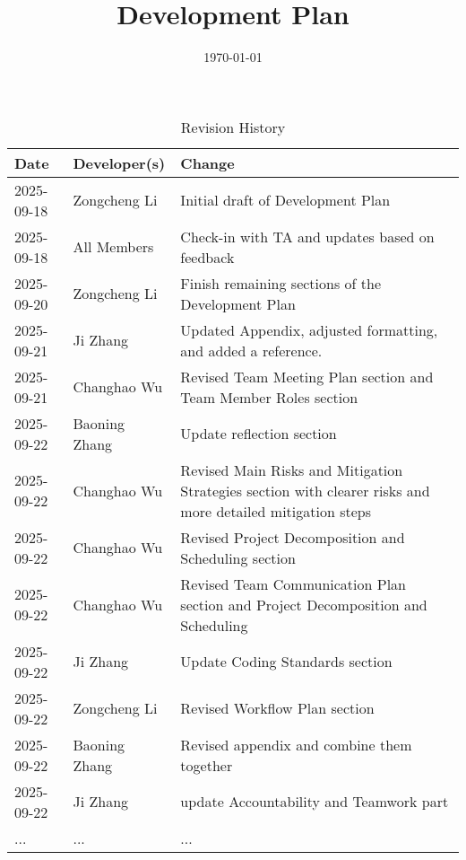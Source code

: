 \documentclass{article}
\title{Development Plan\\\progname}
\author{\authname}
\date{\today}
\begin{document}
\maketitle

\begin{table}[hp]
\caption{Revision History} \label{TblRevisionHistory}
\begin{tabularx}{\textwidth}{llX}
\toprule
\textbf{Date} & \textbf{Developer(s)} & \textbf{Change}\\
\midrule
2025-09-18 & Zongcheng Li   & Initial draft of Development Plan \\
2025-09-18 & All Members    & Check-in with TA and updates based on feedback \\
2025-09-20 & Zongcheng Li   & Finish remaining sections of the Development Plan \\
2025-09-21 & Ji Zhang       & Updated Appendix, adjusted formatting, and added a reference.\\
2025-09-21 & Changhao Wu    & Revised Team Meeting Plan section and Team Member Roles section \\
2025-09-22 & Baoning Zhang    & Update reflection section \\
2025-09-22 & Changhao Wu    & Revised Main Risks and Mitigation Strategies section with clearer risks and more detailed mitigation steps \\
2025-09-22 & Changhao Wu    & Revised Project Decomposition and Scheduling section \\
2025-09-22 & Changhao Wu    & Revised Team Communication Plan section and Project Decomposition and Scheduling\\
2025-09-22 & Ji Zhang       & Update Coding Standards section \\
2025-09-22 & Zongcheng Li    & Revised Workflow Plan section \\
2025-09-22 & Baoning Zhang   & Revised appendix and combine them together \\
2025-09-22 & Ji Zhang       & update Accountability and Teamwork part \\
... & ... & ...\\

\bottomrule
\end{tabularx}
\end{table}

\newpage{}

\end{document}
